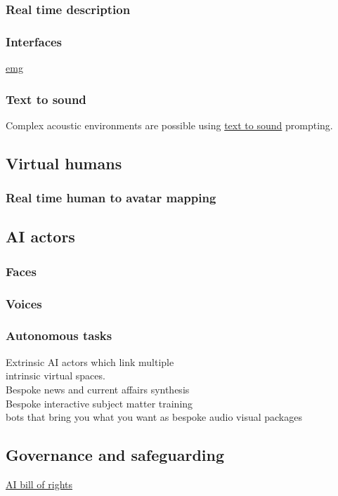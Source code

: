 \subsubsection{Real time description}
\subsubsection{Interfaces}
\href{https://tech.fb.com/ar-vr/2021/03/inside-facebook-reality-labs-wrist-based-interaction-for-the-next-computing-platform/}{emg}
\subsubsection{Text to sound}
Complex acoustic environments are possible using \href{https://anonymous.4open.science/w/iclr2023_samples-CB68/report.html}{text to sound} prompting. 
\subsection{Virtual humans}
\subsubsection{Real time human to avatar mapping}
\subsection{AI actors}
\subsubsection{Faces}
\subsubsection{Voices}
\subsubsection{Autonomous tasks}

Extrinsic AI actors which link multiple\\ intrinsic virtual spaces.\\
Bespoke news and current affairs synthesis\\
Bespoke interactive subject matter training\\
bots that bring you what you want as bespoke audio visual packages
\subsection{Governance and safeguarding}


\href{https://www.whitehouse.gov/ostp/ai-bill-of-rights/}{AI bill of rights}

